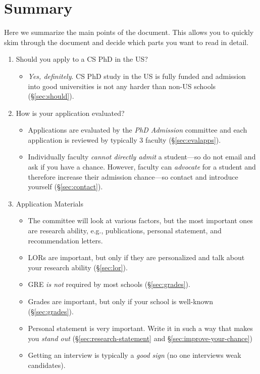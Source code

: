 \documentclass[oneside,11pt]{memoir}
\begin{document}
\newpage
\tableofcontents*

\chapter{Summary}\label{sec:summary}
Here we summarize the main points of the document. This allows you to quickly skim through the document and decide which parts you want to read in detail.
\begin{enumerate}
\item Should you apply to a CS PhD in the US?
\begin{itemize}
    \item \emph{Yes, definitely}.  CS PhD study in the US is fully funded and admission into good universities is not any harder than non-US schools (\S\ref{sec:should}).
\end{itemize}
\item How is your application evaluated?
\begin{itemize}
    \item Applications are evaluated by the \emph{PhD Admission} committee and each application is reviewed by typically 3 faculty (\S\ref{sec:evalapps}).
    \item Individually faculty \emph{cannot directly admit} a student---so do not email and ask if you have a chance. However, faculty can \emph{advocate} for a student and therefore increase their admission chance---so contact and introduce yourself (\S\ref{sec:contact}).
\end{itemize}
\item Application Materials
\begin{itemize}
    \item The committee will look at various factors, but the most important ones are research ability, e.g., publications, personal statement, and recommendation letters.
    \item LORs are important, but only if they are personalized and talk about your research ability (\S\ref{sec:lor}).
    \item GRE \emph{is not} required by most schools (\S\ref{sec:grades}).
    \item Grades are important, but only if your school is well-known (\S\ref{sec:grades}).
    \item Personal statement is very important. Write it in such a way that makes you \emph{stand out} (\S\ref{sec:research-statement} and \S\ref{sec:improve-your-chance})
    \item Getting an interview is typically a \emph{good sign} (no one interviews weak candidates).

\end{itemize}
\end{enumerate}
\end{document}
